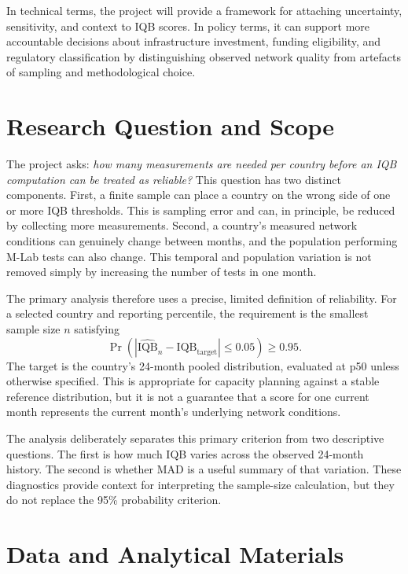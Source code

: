 \documentclass[11pt]{article}
\begin{document}
In technical terms, the project will provide a framework for attaching uncertainty, sensitivity, and
context to IQB scores. In policy terms, it can support more accountable decisions about infrastructure
investment, funding eligibility, and regulatory classification by distinguishing observed network
quality from artefacts of sampling and methodological choice.

\section{Research Question and Scope}

The project asks: \emph{how many measurements are needed per country before an IQB computation can
be treated as reliable?} This question has two distinct components. First, a finite sample can place
a country on the wrong side of one or more IQB thresholds. This is sampling error and can, in
principle, be reduced by collecting more measurements. Second, a country's measured network
conditions can genuinely change between months, and the population performing M-Lab tests can also
change. This temporal and population variation is not removed simply by increasing the number of
tests in one month.

The primary analysis therefore uses a precise, limited definition of reliability. For a selected
country and reporting percentile, the requirement is the smallest sample size $n$ satisfying
\begin{equation}
  \Pr\left(\left|\widehat{\mathrm{IQB}}_n-
  \mathrm{IQB}_{\mathrm{target}}\right| \leq 0.05\right) \geq 0.95.
\end{equation}
The target is the country's 24-month pooled distribution, evaluated at p50 unless otherwise
specified. This is appropriate for capacity planning against a stable reference distribution,
but it is not a guarantee that a score for one current month represents the current month's
underlying network conditions.

The analysis deliberately separates this primary criterion from two descriptive questions. The
first is how much IQB varies across the observed 24-month history. The second is whether MAD is a
useful summary of that variation. These diagnostics provide context for interpreting the sample-size
calculation, but they do not replace the 95\% probability criterion.

\section{Data and Analytical Materials}
\end{document}
